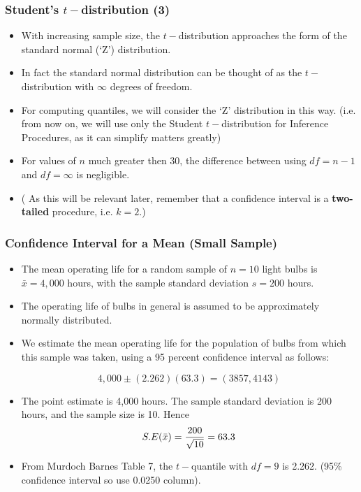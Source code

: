 \documentclass[a4]{beamer}
\begin{document}
\begin{frame}
\frametitle{Student's $t-$distribution (3)}
\begin{itemize}
\item With increasing
sample size, the $t-$distribution approaches the form of the standard normal (`Z') distribution.
\item In fact the standard normal distribution can be thought of as the $t-$distribution with $\infty$ degrees of freedom.
\item For computing quantiles, we will consider the `Z' distribution in this way.
(i.e. from now on, we will use only the Student $t-$distribution for Inference Procedures, as it can simplify matters greatly)

\item For values of $n$ much greater then 30, the difference between using $df = n-1$ and $df = \infty$ is negligible.

\item ( As this will be relevant later, remember that a confidence interval is a \textbf{two-tailed} procedure, i.e. $k=2$.)
\end{itemize}
\end{frame}


\begin{frame}
\frametitle{Confidence Interval for a Mean (Small Sample)}
\begin{itemize}
\item The mean operating life for a random sample of $n = 10$ light bulbs is $\bar{x} = 4,000$ hours, with the sample
standard deviation $s = 200$ hours. \item The operating life of bulbs in general is assumed to be approximately normally distributed.\item
We estimate the mean operating life for the population of bulbs from which this sample was taken, using a 95 percent
confidence interval as follows:

\[4,000\pm(2.262)(63.3)  = (3857,4143)\]

\item The point estimate is 4,000 hours. The sample standard deviation is 200 hours, and the sample size is 10. Hence \[S.E(\bar{x} ) = { 200 \over \sqrt{10}} = 63.3\]

\item From Murdoch Barnes Table 7, the $t-$quantile with $df=9$ is 2.262. (95\% confidence interval so use 0.0250 column).
\end{itemize}
\end{frame}
\end{document}
